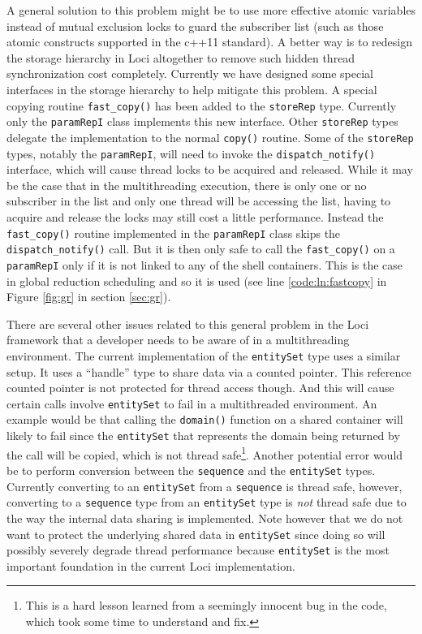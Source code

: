 \documentclass{article}
\begin{document}
A general solution to this problem might be to use more effective atomic
variables instead of mutual exclusion locks to guard the subscriber list
(such as those atomic constructs supported in the c++11 standard).  A
better way is to redesign the storage hierarchy in Loci altogether to
remove such hidden thread synchronization cost completely.  Currently we
have designed some special interfaces in the storage hierarchy to help
mitigate this problem.  A special copying routine
\lstinline{fast_copy()} has been added to the \lstinline{storeRep} type.
Currently only the \lstinline{paramRepI} class implements this new
interface.  Other \lstinline{storeRep} types delegate the implementation
to the normal \lstinline{copy()} routine.  Some of the
\lstinline{storeRep} types, notably the \lstinline{paramRepI}, will need
to invoke the \lstinline{dispatch_notify()} interface, which will cause
thread locks to be acquired and released.  While it may be the case that
in the multithreading execution, there is only one or no subscriber in
the list and only one thread will be accessing the list, having to
acquire and release the locks may still cost a little performance.
Instead the \lstinline{fast_copy()} routine implemented in the
\lstinline{paramRepI} class skips the \lstinline{dispatch_notify()}
call.  But it is then only safe to call the \lstinline{fast_copy()} on a
\lstinline{paramRepI} only if it is not linked to any of the shell
containers.  This is the case in global reduction scheduling and so it
is used (see line \ref{code:ln:fastcopy} in Figure \ref{fig:gr} in
section \ref{sec:gr}).

There are several other issues related to this general problem in the
Loci framework that a developer needs to be aware of in a multithreading
environment.  The current implementation of the \lstinline{entitySet}
type uses a similar setup.  It uses a ``handle'' type to share data via
a counted pointer.  This reference counted pointer is not protected for
thread access though.  And this will cause certain calls involve
\lstinline{entitySet} to fail in a multithreaded environment.  An
example would be that calling the \lstinline{domain()} function on a
shared container will likely to fail since the \lstinline{entitySet}
that represents the domain being returned by the call will be copied,
which is not thread safe\footnote{This is a hard lesson learned from a
  seemingly innocent bug in the code, which took some time to understand
and fix.}.  Another potential error would be to perform
conversion between the \lstinline{sequence} and the
\lstinline{entitySet} types.  Currently converting to an
\lstinline{entitySet} from a \lstinline{sequence} is thread safe,
however, converting to a \lstinline{sequence} type from an
\lstinline{entitySet} type is \emph{not} thread safe due to the way the
internal data sharing is implemented.  Note however that we do not want
to protect the underlying shared data in \lstinline{entitySet} since
doing so will possibly severely degrade thread performance because
\lstinline{entitySet} is the most important foundation in the current
Loci implementation.
\end{document}
